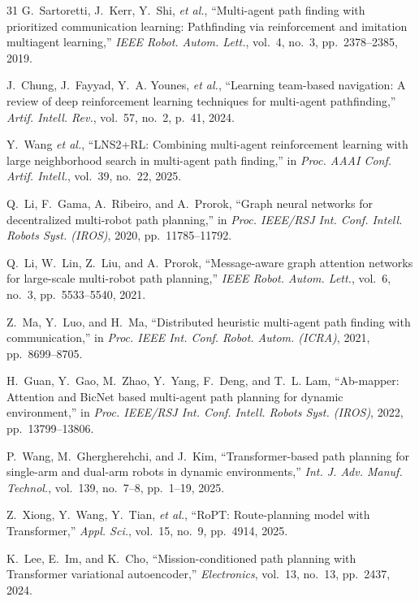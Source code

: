 \documentclass[conference]{IEEEtran}
\newcommand{\etal}{\textit{et al.}}
\begin{document}
{\begin{thebibliography}{31}
G.~Sartoretti, J.~Kerr, Y.~Shi, \etal,
``Multi-agent path finding with prioritized communication
learning: Pathfinding via reinforcement and imitation multiagent
learning,''
\emph{IEEE Robot. Autom. Lett.}, vol.~4, no.~3,
pp.~2378--2385, 2019.

J.~Chung, J.~Fayyad, Y.~A. Younes, \etal,
``Learning team-based navigation: A review of deep reinforcement
learning techniques for multi-agent pathfinding,''
\emph{Artif. Intell. Rev.}, vol.~57, no.~2, p.~41, 2024.

Y.~Wang \etal,
``LNS2+RL: Combining multi-agent reinforcement learning with
large neighborhood search in multi-agent path finding,''
in \emph{Proc. AAAI Conf. Artif. Intell.}, vol.~39, no.~22,
2025.

Q.~Li, F.~Gama, A.~Ribeiro, and A.~Prorok,
``Graph neural networks for decentralized multi-robot path
planning,''
in \emph{Proc. IEEE/RSJ Int. Conf. Intell. Robots Syst. (IROS)},
2020, pp.~11785--11792.

Q.~Li, W.~Lin, Z.~Liu, and A.~Prorok,
``Message-aware graph attention networks for large-scale
multi-robot path planning,''
\emph{IEEE Robot. Autom. Lett.}, vol.~6, no.~3,
pp.~5533--5540, 2021.

Z.~Ma, Y.~Luo, and H.~Ma,
``Distributed heuristic multi-agent path finding with
communication,''
in \emph{Proc. IEEE Int. Conf. Robot. Autom. (ICRA)},
2021, pp.~8699--8705.

H.~Guan, Y.~Gao, M.~Zhao, Y.~Yang, F.~Deng, and T.~L. Lam,
``Ab-mapper: Attention and BicNet based multi-agent path planning
for dynamic environment,''
in \emph{Proc. IEEE/RSJ Int. Conf. Intell. Robots Syst. (IROS)},
2022, pp.~13799--13806.

P.~Wang, M.~Ghergherehchi, and J.~Kim,
``Transformer-based path planning for single-arm and dual-arm
robots in dynamic environments,''
\emph{Int. J. Adv. Manuf. Technol.}, vol.~139, no.~7--8,
pp.~1--19, 2025.

Z.~Xiong, Y.~Wang, Y.~Tian, \etal,
``RoPT: Route-planning model with Transformer,''
\emph{Appl. Sci.}, vol.~15, no.~9, pp.~4914, 2025.

K.~Lee, E.~Im, and K.~Cho,
``Mission-conditioned path planning with Transformer variational
autoencoder,''
\emph{Electronics}, vol.~13, no.~13, pp.~2437, 2024.


\end{thebibliography}}
\end{document}
